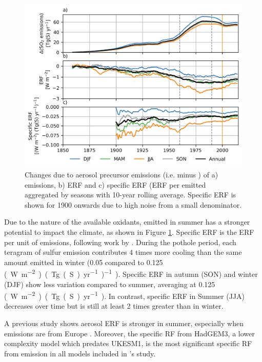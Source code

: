 \begin{figure}
    \centering
    \includegraphics{Chapter4/Figs/seasonal_specific_erf.png}
    \caption[Specific ERF aggregated by seasons between 1900--2014]{Changes due to aerosol precursor emissions (i.e. \histsst{} minus \sstpiaer{}) of a)  emissions, b) ERF and c) specific ERF (ERF per emitted  aggregated by seasons with 10-year rolling average. Specific ERF is shown for 1900 onwards due to high noise from a small denominator. }
    \label{fig:ch4:specific-erf}
\end{figure}

Due to the nature of the available oxidants,  emitted in summer has a stronger potential to impact the climate, as shown in Figure \ref{fig:ch4:specific-erf}. Specific ERF is the ERF per unit of  emissions, following work by \citet{bellouinRegionalSeasonalRadiative2016}. During the pothole period, each teragram of sulfur emission contributes 4 times more cooling than the same amount emitted in winter (0.05 compared to 0.125 \unit{(W~m^{-2})~(Tg(S)~yr^{-1})^{-1})}. Specific ERF in autumn (SON) and winter (DJF) show less variation compared to summer, averaging at 0.125 \unit{(W~m^{-2})~(Tg(S)~yr^{-1})}. In contrast, specific ERF in Summer (JJA) decreases over time but is still at least 2 times greater than in winter.

A previous study shows aerosol ERF is stronger in summer, especially when emissions are from Europe \citep{bellouinRegionalSeasonalRadiative2016}. Moreover, the specific RF from HadGEM3, a lower complexity model which predates UKESM1, is the most significant specific RF from  emission in all models included in \citet{bellouinRegionalSeasonalRadiative2016}'s study. 


